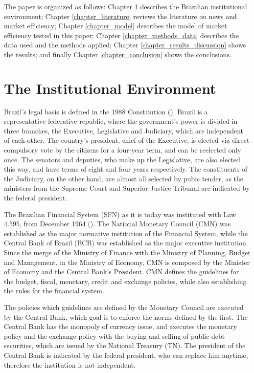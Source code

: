 \documentclass[cic,tc, english]{iiufrgs}
\begin{document}
    The paper is organized as follows: Chapter \ref{chapter_institutional} describes the Brazilian institutional environment; Chapter \ref{chapter_literature} reviews the literature on news and market efficiency; Chapter \ref{chapter_model} describes the model of market efficiency tested in this paper; Chapter \ref{chapter_methods_data} describes the data used and the methods applied; Chapter \ref{chapter_results_discussion} shows the results; and finally Chapter \ref{chapter_conclusion} shows the conclusions.

\chapter{The Institutional Environment} \label{chapter_institutional}

    Brazil's legal basis is defined in the 1988 Constitution (\citet{constituicao}). Brazil is a representative federative republic, where the government's power is divided in three branches, the Executive, Legislative and Judiciary, which are independent of each other. The country's president, chief of the Executive, is elected via direct compulsory vote by the citizens for a four-year term, and can be reelected only once. The senators and deputies, who make up the Legislative, are also elected this way, and have terms of eight and four years respectively. The constituents of the Judiciary, on the other hand, are almost all selected by pubic tender, as the ministers from the Supreme Court and Superior Justice Tribunal are indicated by the federal president.

    The Brazilian Financial System (SFN) as it is today was instituted with Law 4.595, from December 1964 (\citet{lei4595}). The National Monetary Council (CMN) was established as the major normative institution of the Financial System, while the Central Bank of Brazil (BCB) was established as the major executive institution. Since the merge of the Ministry of Finance with the Ministry of Planning, Budget and Management, in the Ministry of Economy, CMN is composed by the Minister of Economy and the Central Bank's President. CMN defines the guidelines for the budget, fiscal, monetary, credit and exchange policies, while also establishing the rules for the financial system.

    The policies which guidelines are defined by the Monetary Council are executed by the Central Bank, which goal is to enforce the norms defined by the first. The Central Bank has the monopoly of currency issue, and executes the monetary policy and the exchange policy with the buying and selling of public debt securities, which are issued by the National Treasury (TN). The president of the Central Bank is indicated by the federal president, who can replace him anytime, therefore the institution is not independent.
\end{document}
